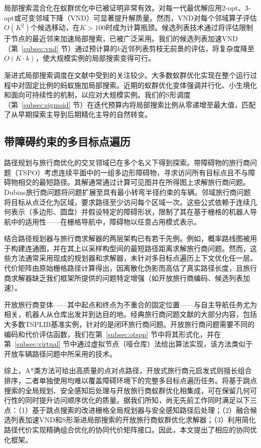 \documentclass[lettersize,journal]{IEEEtran}
\begin{document}
局部搜索混合化在蚁群优化中已被证明非常有效。对每一代最优解应用2-opt、3-opt或可变邻域下降（VND）可显著提升解质量\cite{ref24,ref25}。然而，VND对每个邻域算子评估$O(K^2)$个候选移动，在$K > 100$时成为计算瓶颈。候选列表技术通过将评估限制于节点的最近邻来加速局部搜索，已被广泛采用\cite{ref26}。我们的候选列表加速VND（第~\textcolor{blue}{\ref{subsec:vnd}} 节）通过预计算的$k$近邻列表剪枝无前景的评估，将复杂度降至$O(K \cdot k)$，使大规模实例的局部搜索变得可行。

渐进式局部搜索调度在文献中受到的关注较少。大多数蚁群优化实现在整个运行过程中对固定比例的蚂蚁施加局部搜索。近期的蚁群优化变体强调并行化、小生境化和面向可持续性的机制，以应对大规模实例\cite{ref27,ref28,ref29,ref30}。我们的S形调度（第~\textcolor{blue}{\ref{subsec:sigmoid}} 节）在迭代预算内将局部搜索比例从零递增至最大值，匹配了从早期探索主导到后期精化主导的自然转变。

\subsection{带障碍约束的多目标点遍历}

路径规划与旅行商优化的交叉领域已在多个名义下得到探索\cite{ref4}。带障碍物的旅行商问题（TSPO）考虑连续平面中的一组多边形障碍物，寻求访问所有目标点且不与障碍物相交的最短路径\cite{ref3}。其解通常通过计算可见图并在所得图上求解旅行商问题。Dubins旅行商问题将问题扩展至具有最小转弯半径约束的车辆。邻域旅行商问题将目标从点泛化为区域，要求路径至少访问每个区域一次。这些公式依赖于连续几何表示（多边形、圆盘）并假设特定的障碍形状，限制了其在基于栅格的机器人导航中的适用性——在栅格导航中，障碍物以任意占用模式表示。

结合路径规划器与旅行商求解器的两层架构已有若干先例\cite{ref1,ref2}。例如，概率路线图被用于构建连通图，并在其上以采样构型间的最短路径距离求解旅行商问题。然而，这些方法通常采用现成的规划器和求解器，未针对多目标点遍历上下文优化任一层。代价矩阵由原始栅格路径计算得出，因离散化伪影而高估了真实路径长度，且旅行商求解器缺乏我们框架所提供的问题特定增强（如开放旅行商编码、候选列表加速）。

开放旅行商变体——其中起点和终点为不重合的固定位置——与自主导航任务尤为相关，机器人从仓库出发并到达目的地。经典旅行商问题文献的大部分内容，包括大多数TSPLIB基准实例，针对的是闭环旅行商问题。开放旅行商问题需要不同的编码和代价评估函数，我们在第~\textcolor{blue}{\ref{subsec:otspp}} 节中将其形式化，并在第~\textcolor{blue}{\ref{subsec:virtual}} 节中通过虚拟节点（哑仓库）法给出算法实现，该方法类似于开放车辆路径问题中所采用的技术\cite{ref31,ref32}。

综上，A*类方法可给出高质量的点对点路径，开放式旅行商元启发式则擅长组合排序，二者单独使用均难以覆盖障碍环境下的完整多目标点遍历任务。将基于跳点搜索的全局规划、安全感知后处理与开放旅行商蚁群优化相集成，可在保留几何可行性的同时提升访问顺序优化的质量。据我们所知，尚无先前工作同时满足以下三点：（1）基于跳点搜索的改进栅格全局规划器与安全感知路径后处理；（2）融合候选列表加速VND和S形渐进局部搜索的开放旅行商蚁群优化求解器；（3）利用简化路径代价实现精确组合优化的协同代价矩阵接口。因此，本文提出了相应的协同优化框架。
\end{document}
